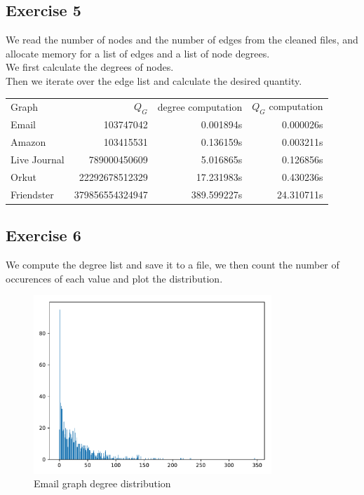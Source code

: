 \documentclass{article}
\begin{document}
\subsection*{Exercise 5}%
\label{sub:tp1ex5}
We read the number of nodes and the number of edges from the cleaned files, and
allocate memory for a list of edges and a list of node degrees.\\
We first calculate the degrees of nodes.\\
Then we iterate over the edge list and calculate the desired quantity.
\begin{table}[!ht]
    \centering
    \label{tab:label}
    \begin{tabular}{lrrr}
        Graph & $Q_G$ & degree computation& $Q_G$ computation\\
        Email&
        103747042&
        0.001894s&
        0.000026s\\
        Amazon&
        103415531&
        0.136159s&
        0.003211s\\
        Live Journal&
        789000450609&
        5.016865s&
        0.126856s\\
        Orkut&
        22292678512329&
        17.231983s&
        0.430236s\\
        Friendster&
        379856554324947&
        389.599227s&
        24.310711s\\
    \end{tabular}
\end{table}

\subsection*{Exercise 6}%
\label{sub:tp1ex6}
We compute the degree list and save it to a file, we then count the number of
occurences of each value and plot the distribution.

\begin{figure}[H]
    \centering
    \includegraphics[width=0.8\textwidth]{plots/email-Eu-core.pdf}
    \caption{Email graph degree distribution}
    \label{fig:email-deg}
\end{figure}
\end{document}
